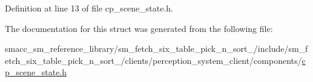 Definition at line 13 of file cp\+\_\+scene\+\_\+state.\+h.



The documentation for this struct was generated from the following file\+:\begin{DoxyCompactItemize}
\item 
smacc\+\_\+sm\+\_\+reference\+\_\+library/sm\+\_\+fetch\+\_\+six\+\_\+table\+\_\+pick\+\_\+n\+\_\+sort\+\_/include/sm\+\_\+fetch\+\_\+six\+\_\+table\+\_\+pick\+\_\+n\+\_\+sort\+\_/clients/perception\+\_\+system\+\_\+client/components/\hyperlink{cp__scene__state_8h}{cp\+\_\+scene\+\_\+state.\+h}\end{DoxyCompactItemize}
